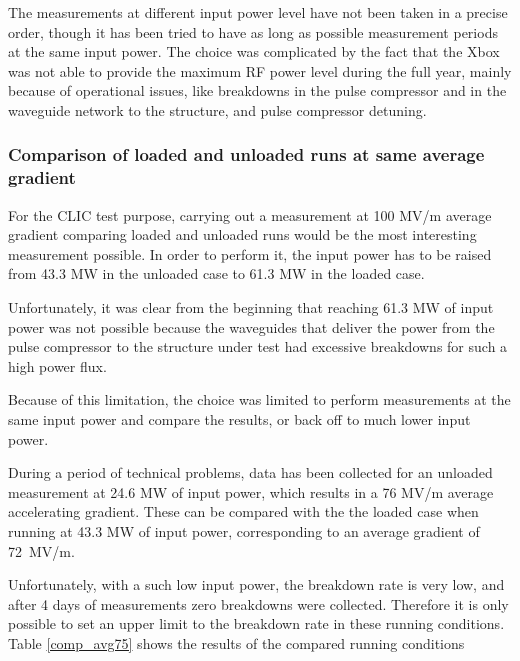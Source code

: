 The measurements at different input power level have not been taken in a precise order, though it has been tried to have as long as possible measurement periods at the same input power. 
The choice was complicated by the fact that the Xbox was not able to provide the maximum RF power level during the full year, mainly because of operational issues, like breakdowns in the pulse compressor and in the waveguide network to the structure, and pulse compressor detuning.


\subsubsection{Comparison of loaded and unloaded runs at same average gradient}

For the CLIC test purpose,  carrying out a measurement at 100 MV/m average gradient comparing loaded and unloaded runs would be the most interesting measurement possible. In order to perform it, the input power has to be raised from 43.3 MW in the unloaded case to 61.3 MW in the loaded case.

Unfortunately, it was clear from the beginning that reaching 61.3 MW of input power was not possible because the waveguides that deliver the power from the pulse compressor to the structure under test had excessive breakdowns for such a high power flux.

Because of this limitation, the choice was limited to perform measurements at the same input power and compare the results, or back off to much lower input power. 

During a period of technical problems, data has been collected for an unloaded measurement at 24.6 MW of input power, which results in a 76 MV/m average accelerating gradient. These can be compared with the the loaded case when running at 43.3 MW of input power, corresponding to an average gradient of 72~MV/m. 

Unfortunately, with a such low input power, the breakdown rate is very low, and after 4 days of measurements zero breakdowns were collected. Therefore it is only possible to set an upper limit to the breakdown rate in these running conditions. Table \ref{comp_avg75} shows the results of the compared running conditions


